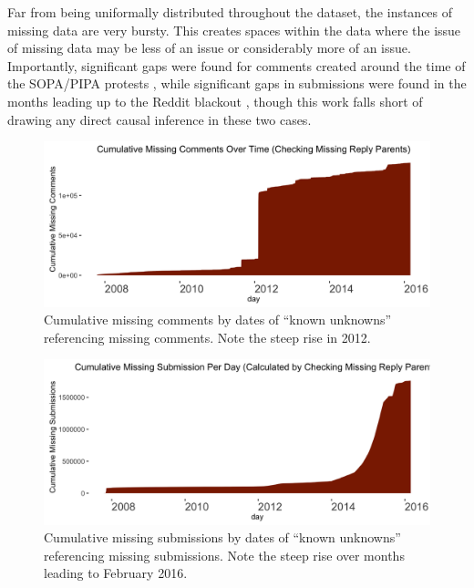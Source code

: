 \documentclass[letterpaper,12pt]{article}
\begin{document}
Far from being uniformally distributed throughout the dataset, the instances of missing data are very bursty. This creates spaces within the data where the issue of missing data may be less of an issue or considerably more of an issue. Importantly, significant gaps were found for comments created around the time of the SOPA/PIPA protests \cite{benkler2015social}, while significant gaps in submissions were found in the months leading up to the Reddit blackout \cite{matias2016going}, though this work falls short of drawing any direct causal inference in these two cases.

\begin{figure}[h]
  \centering
  \includegraphics[width=\textwidth]{cumulative_missing_comments_time}
  \caption{Cumulative missing comments by dates of ``known unknowns'' referencing missing comments. Note the steep rise in 2012.}
  \label{fig:cumulative_missing_comments_time}
\end{figure}

\begin{figure}[h]
  \centering
  \includegraphics[width=\textwidth]{cumulative_missing_submissions_time}
  \caption{Cumulative missing submissions by dates of ``known unknowns'' referencing missing submissions. Note the steep rise over months leading to February 2016.}
  \label{fig:cumulative_missing_submissions_time}
\end{figure}
\end{document}
